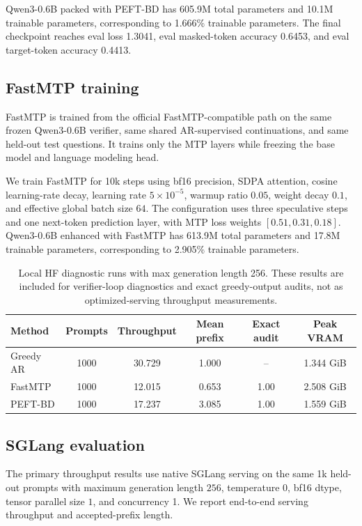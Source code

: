 \documentclass[11pt]{article}
\begin{document}
Qwen3-0.6B packed with PEFT-BD has 605.9M total parameters and 10.1M trainable parameters, corresponding to 1.666\% trainable parameters. The final checkpoint reaches eval loss 1.3041, eval masked-token accuracy 0.6453, and eval target-token accuracy 0.4413.

\subsection{FastMTP training}

FastMTP is trained from the official FastMTP-compatible path on the same frozen Qwen3-0.6B verifier, same shared AR-supervised continuations, and same held-out test questions. It trains only the MTP layers while freezing the base model and language modeling head.

We train FastMTP for 10k steps using bf16 precision, SDPA attention, cosine learning-rate decay, learning rate $5\times 10^{-5}$, warmup ratio $0.05$, weight decay $0.1$, and effective global batch size $64$. The configuration uses three speculative steps and one next-token prediction layer, with MTP loss weights $[0.51,0.31,0.18]$. Qwen3-0.6B enhanced with FastMTP has 613.9M total parameters and 17.8M trainable parameters, corresponding to 2.905\% trainable parameters.

\begin{table}[t]
\centering
\normalsize
\begin{tabular}{lccccc}
\toprule
Method & Prompts & Throughput & Mean prefix & Exact audit & Peak VRAM \\
\midrule
Greedy AR & 1000 & 30.729 & 1.000 & -- & 1.344 GiB \\
FastMTP & 1000 & 12.015 & 0.653 & 1.00 & 2.508 GiB \\
PEFT-BD & 1000 & 17.237 & 3.085 & 1.00 & 1.559 GiB \\
\bottomrule
\end{tabular}
\caption{
Local HF diagnostic runs with max generation length 256. 
These results are included for verifier-loop diagnostics and exact greedy-output
audits, not as optimized-serving throughput measurements.
}
\label{tab:hf_diagnostics}
\end{table}

\subsection{SGLang evaluation}

The primary throughput results use native SGLang serving on the same 1k held-out prompts with maximum generation length $256$, temperature $0$, bf16 dtype, tensor parallel size $1$, and concurrency 1. We report end-to-end serving throughput and accepted-prefix length.
\end{document}
